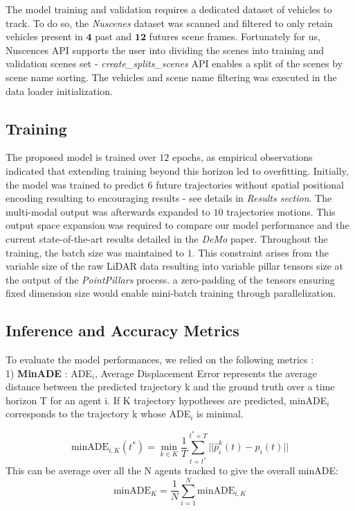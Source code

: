 \documentclass[conference]{IEEEtran}
\begin{document}
The model training and validation requires a dedicated dataset of vehicles to track.  To do so, the \textit{Nuscenes} dataset was scanned and filtered to only retain vehicles present in $\textbf{4}$ past and $\textbf{12}$ futures scene frames.  Fortunately for us, Nuscences API supports the user into dividing the scenes into training and validation scenes set - \textit{create\_splits\_scenes} API enables a split of the scenes by scene name sorting.  The vehicles and scene name filtering was executed in the data loader initialization.


\subsection{Training}

The proposed model is trained over $12$ epochs, as empirical observations indicated that extending training beyond this horizon led to overfitting.  Initially, the model was trained to predict $6$ future trajectories without spatial positional encoding resulting to encouraging results - see details in \textit{Results section}.  The multi-modal output was afterwards expanded to $10$  trajectories motions.  This output space expansion was required to compare our model performance and the current state-of-the-art results detailed in the \textit{DeMo} paper.  
Throughout the training, the batch size was maintained to $1$. This constraint arises from the variable size of the raw LiDAR data resulting into variable pillar tensors size at the output of the \textit{PointPillars} process.  a zero-padding of the tensors ensuring fixed dimension size would enable mini-batch training through parallelization.

\subsection{Inference and Accuracy Metrics}

To evaluate the model performances, we relied on the following metrics :
\\

1) \textbf{MinADE} : ADE$_i$, Average Displacement Error represents the average distance between the predicted trajectory k and the ground truth over a time horizon T for an agent i.
If K trajectory hypotheses are predicted, minADE$_i$ corresponds to the trajectory k whose ADE$_i$ is minimal.

\begin{equation}
    \text{minADE}_{i,K}(t^{*}) = \min_{k \in K} \frac{1}{T} \sum^{t^* + T}_{t = t^*}|| \hat{p}^{k}_i(t) - p_i(t)||
\end{equation}
This can be average over all the N agents tracked to give the overall minADE:
\begin{equation}
    \text{minADE}_{K} = \frac{1}{N}\sum_{i = 1}^N\text{minADE}_{i,K}
\end{equation}
\\
\end{document}
